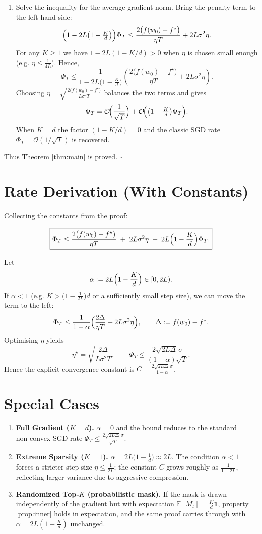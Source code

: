 \documentclass{article}
\newcommand{\E}{\mathbb{E}}
\begin{document}
\begin{enumerate}
\item[Step 9.] Solve the inequality for the average gradient norm.  
Bring the penalty term to the left‑hand side:
\[
\Bigl(1-2L\bigl(1-\tfrac{K}{d}\bigr)\Bigr)
\Phi_T
\le
\frac{2\bigl(f(w_0)-f^\star\bigr)}{\eta T}+2L\sigma^{2}\eta .
\]
For any \(K\ge 1\) we have \(1-2L(1-K/d)>0\) when \(\eta\) is chosen small enough (e.g. \(\eta\le \frac{1}{4L}\)).  
Hence,
\[
\Phi_T\le
\frac{1}{1-2L\bigl(1-\tfrac{K}{d}\bigr)}
\left(
\frac{2\bigl(f(w_0)-f^\star\bigr)}{\eta T}+2L\sigma^{2}\eta
\right).
\]
Choosing \(\displaystyle\eta=\sqrt{\frac{2\bigl(f(w_0)-f^\star\bigr)}{L\sigma^{2}T}}\) balances the two terms and gives
\[
\Phi_T = \mathcal{O}\!\Bigl(\frac{1}{\sqrt{T}}\Bigr)
   +\mathcal{O}\!\Bigl(\bigl(1-\tfrac{K}{d}\bigr)\Phi_T\Bigr).
\]
When \(K=d\) the factor \((1-K/d)=0\) and the classic SGD rate \(\Phi_T=\mathcal{O}(1/\sqrt{T})\) is recovered.
\end{enumerate}
Thus Theorem \ref{thm:main} is proved. \(\square\)

\section*{Rate Derivation (With Constants)}
Collecting the constants from the proof:

\[
\boxed{
\Phi_T\le
\frac{2\bigl(f(w_0)-f^\star\bigr)}{\eta T}
\;+\;
2L\sigma^{2}\eta
\;+\;
2L\Bigl(1-\frac{K}{d}\Bigr)\Phi_T .
}
\]

Let
\[
\alpha:=2L\Bigl(1-\frac{K}{d}\Bigr)\in[0,2L).
\]
If \(\alpha<1\) (e.g. \(K>\bigl(1-\tfrac{1}{2L}\bigr)d\) or a sufficiently small step size), we can move the term to the left:
\[
\Phi_T\le\frac{1}{1-\alpha}\Bigl(\frac{2\Delta}{\eta T}+2L\sigma^{2}\eta\Bigr),
\qquad \Delta:=f(w_0)-f^\star .
\]
Optimising \(\eta\) yields
\[
\eta^{\star}= \sqrt{\frac{2\Delta}{L\sigma^{2}T}},
\qquad
\Phi_T\le
\frac{2\sqrt{2L\Delta}\,\sigma}{(1-\alpha)\sqrt{T}} .
\]
Hence the explicit convergence constant is \(\displaystyle C=\frac{2\sqrt{2L\Delta}\,\sigma}{1-\alpha}\).

\section*{Special Cases}
\begin{enumerate}[nosep]
  \item \textbf{Full Gradient (\(K=d\)).} \(\alpha=0\) and the bound reduces to the standard non‑convex SGD rate \(\Phi_T\le\frac{2\sqrt{2L\Delta}\,\sigma}{\sqrt{T}}\).
  \item \textbf{Extreme Sparsity (\(K=1\)).} \(\alpha=2L\bigl(1-\frac{1}{d}\bigr)\approx2L\).  The condition \(\alpha<1\) forces a stricter step size \(\eta\le\frac{1}{2L}\); the constant \(C\) grows roughly as \(\frac{1}{1-2L}\), reflecting larger variance due to aggressive compression.
  \item \textbf{Randomized Top‑\(K\) (probabilistic mask).}  If the mask is drawn independently of the gradient but with expectation \(\E[M_t]=\frac{K}{d}\mathbf 1\), property \eqref{prop:inner} holds in expectation, and the same proof carries through with \(\alpha=2L(1-\frac{K}{d})\) unchanged.
\end{enumerate}
\end{document}
